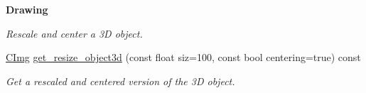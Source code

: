 \begin{Indent}{\bf Drawing}
\begin{DoxyCompactItemize}
\begin{DoxyCompactList}\small\item\em Rescale and center a 3D object. \item\end{DoxyCompactList}\item 
\hypertarget{structcimg__library_1_1_c_img_a0eb2fd6df11f88e4d7fd0e94b40301c3}{
\hyperlink{structcimg__library_1_1_c_img}{CImg} \hyperlink{structcimg__library_1_1_c_img_a0eb2fd6df11f88e4d7fd0e94b40301c3}{get\_\-resize\_\-object3d} (const float siz=100, const bool centering=true) const }
\label{structcimg__library_1_1_c_img_a0eb2fd6df11f88e4d7fd0e94b40301c3}

\begin{DoxyCompactList}\small\item\em Get a rescaled and centered version of the 3D object. \item\end{DoxyCompactList}\end{DoxyCompactItemize}
\end{Indent}
